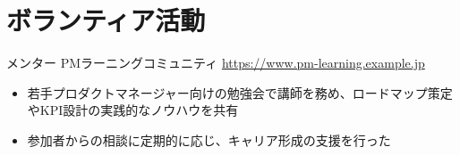 \documentclass[a4paper, serif, 10pt]{moderncv}
\begin{document}
\section{ボランティア活動}

        {メンター}
        {PMラーニングコミュニティ}
        {\url{https://www.pm-learning.example.jp}}
        {}
        {\begin{itemize}
\item 若手プロダクトマネージャー向けの勉強会で講師を務め、ロードマップ策定やKPI設計の実践的なノウハウを共有
\item 参加者からの相談に定期的に応じ、キャリア形成の支援を行った
\end{itemize}}
    
\end{document}
